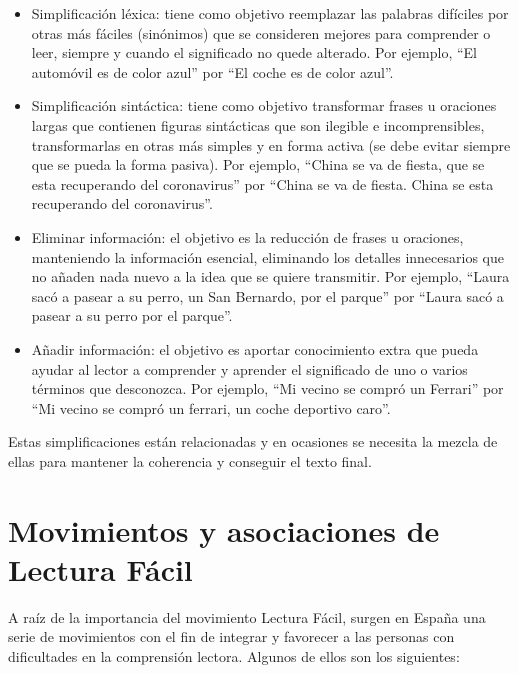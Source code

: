  \begin{itemize}
	
	\item Simplificación léxica: tiene como objetivo reemplazar las palabras difíciles por otras más fáciles (sinónimos) que se consideren mejores para comprender o leer, siempre y cuando el significado no quede alterado. Por ejemplo, ``El automóvil es de color azul'' por ``El coche es de color azul''.
	
	\item Simplificación sintáctica: tiene como objetivo transformar frases u oraciones largas que contienen figuras sintácticas que son ilegible e incomprensibles, transformarlas en otras más simples y en forma activa (se debe evitar siempre que se pueda la forma pasiva). Por ejemplo, ``China se va de fiesta, que se esta recuperando del coronavirus'' por ``China se va de fiesta. China se esta recuperando del coronavirus''. 
	
	\item Eliminar información: el objetivo es la reducción de frases u oraciones, manteniendo la información esencial, eliminando los detalles innecesarios que no añaden nada nuevo a la idea que se quiere transmitir. Por ejemplo, ``Laura sacó a pasear a su perro, un San Bernardo, por el parque'' por ``Laura sacó a pasear a su perro por el parque''. 
	
	\item Añadir información: el objetivo es aportar conocimiento extra que pueda ayudar al lector a comprender y aprender el significado de uno o varios términos que desconozca. Por ejemplo, ``Mi vecino se compró un Ferrari'' por ``Mi vecino se compró un ferrari, un coche deportivo caro''. 
	
\end{itemize}


 Estas simplificaciones están relacionadas y en ocasiones se necesita la mezcla de ellas para mantener la coherencia y conseguir el texto final.




\section{Movimientos y asociaciones de Lectura Fácil}

A raíz de la importancia del movimiento Lectura Fácil, surgen en España una serie de movimientos con el fin de integrar y favorecer a las personas con dificultades en la comprensión lectora. Algunos de ellos son los siguientes:


